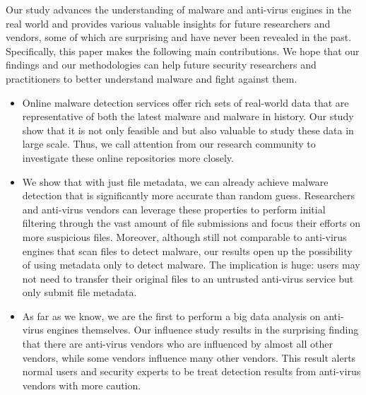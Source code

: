 Our study advances the understanding of malware and anti-virus engines in the real world 
and provides various valuable insights for future researchers and vendors, 
some of which are surprising and have never been revealed in the past.
Specifically, this paper makes the following main contributions.
We hope that our findings and our methodologies can help future security researchers and practitioners 
to better understand malware and fight against them.

\vspace{-0.05in}
\begin{itemize}
\item 
Online malware detection services offer rich sets of real-world data that are representative of 
both the latest malware and malware in history.
Our study show that it is not only feasible and but also valuable to study these data in large scale.
Thus, we call attention from our research community to investigate these online repositories more closely.



\item
We show that with just file metadata, we can already achieve malware detection that is significantly more accurate than random guess.
Researchers and anti-virus vendors can leverage these properties 
to perform initial filtering through the vast amount of file submissions
and focus their efforts on more suspicious files.
Moreover, although still not comparable to anti-virus engines that scan files to detect malware, 
our results open up the possibility of using metadata only to detect malware. 
The implication is huge: users may not need to transfer their original files to an untrusted anti-virus service
but only submit file metadata.

\item
As far as we know, we are the first to perform a big data analysis on anti-virus engines themselves.
Our influence study results in the surprising finding that there are anti-virus vendors who are influenced by almost all other vendors,
while some vendors influence many other vendors. 
This result alerts normal users and security experts to be treat detection results from anti-virus vendors with more caution.


\end{itemize}

